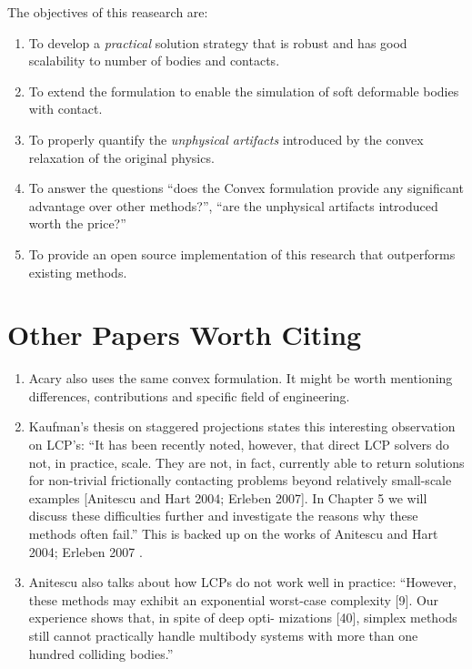 The objectives of this reasearch are:
\begin{enumerate}
	\item To develop a \textit{practical} solution strategy that is robust and
	has good scalability to number of bodies and contacts.
	\item To extend the formulation to enable the simulation of soft deformable
	bodies with contact.
	\item To properly quantify the \textit{unphysical artifacts} introduced by
	the convex relaxation of the original physics.
	\item To answer the questions ``does the Convex formulation provide any
	significant advantage over other methods?'', ``are the unphysical artifacts
	introduced worth the price?''
	\item To provide an open source implementation of this research that
	outperforms existing methods.
\end{enumerate}

\section{Other Papers Worth Citing}

\begin{enumerate}
	\item Acary \cite{bib:acary2011formulation} also uses the same convex
	formulation. It might be worth mentioning differences, contributions and
	specific field of engineering.
	\item Kaufman's thesis on staggered projections
	\cite{bib:kaufman2009coupled} states this interesting observation on LCP's:
	``It has been recently noted, however, that direct LCP solvers do not, in
	practice, scale. They are not, in fact, currently able to return solutions
	for non-trivial frictionally contacting problems beyond relatively
	small-scale examples [Anitescu and Hart 2004; Erleben 2007]. In Chapter 5 we
	will discuss these difficulties further and investigate the reasons why
	these methods often fail.'' This is backed up on the works of Anitescu and
	Hart 2004; Erleben 2007 \cite{bib:anitescu2004fixed,bib:erleben2007velocity}.
	\item Anitescu \cite{bib:anitescu2010} also talks about how LCPs do not work
	well in practice: ``However, these methods may exhibit an exponential
	worst-case complexity [9]. Our experience shows that, in spite of deep opti-
	mizations [40], simplex methods still cannot practically handle multibody
	systems with more than one hundred colliding bodies.''
\end{enumerate}

